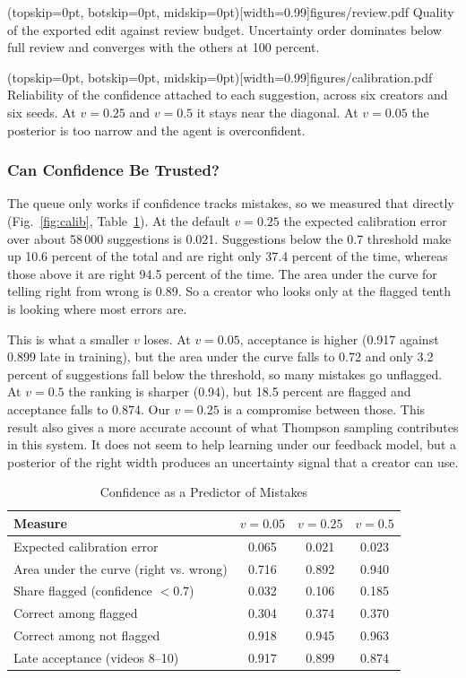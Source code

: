 \documentclass{ieeeaccess}
\begin{document}
\Figure[t!](topskip=0pt, botskip=0pt, midskip=0pt)[width=0.99\columnwidth]{figures/review.pdf}
{Quality of the exported edit against review budget. Uncertainty order dominates below full review and converges with the others at 100 percent.\label{fig:review}}

\Figure[t!](topskip=0pt, botskip=0pt, midskip=0pt)[width=0.99\columnwidth]{figures/calibration.pdf}
{Reliability of the confidence attached to each suggestion, across six creators and six seeds. At $v=0.25$ and $v=0.5$ it stays near the diagonal. At $v=0.05$ the posterior is too narrow and the agent is overconfident.\label{fig:calib}}

\subsubsection{Can Confidence Be Trusted?}
The queue only works if confidence tracks mistakes, so we measured that directly (Fig.~\ref{fig:calib}, Table~\ref{tab:calib}). At the default $v=0.25$ the expected calibration error over about 58\,000 suggestions is 0.021. Suggestions below the 0.7 threshold make up 10.6 percent of the total and are right only 37.4 percent of the time, whereas those above it are right 94.5 percent of the time. The area under the curve for telling right from wrong is 0.89. So a creator who looks only at the flagged tenth is looking where most errors are.

This is what a smaller $v$ loses. At $v=0.05$, acceptance is higher (0.917 against 0.899 late in training), but the area under the curve falls to 0.72 and only 3.2 percent of suggestions fall below the threshold, so many mistakes go unflagged. At $v=0.5$ the ranking is sharper (0.94), but 18.5 percent are flagged and acceptance falls to 0.874. Our $v=0.25$ is a compromise between those. This result also gives a more accurate account of what Thompson sampling contributes in this system. It does not seem to help learning under our feedback model, but a posterior of the right width produces an uncertainty signal that a creator can use.

\begin{table}[t]
\caption{Confidence as a Predictor of Mistakes}
\label{tab:calib}
\setlength{\tabcolsep}{3pt}
\centering
\begin{tabular}{|l|c|c|c|}
\hline
Measure & $v=0.05$ & $v=0.25$ & $v=0.5$ \\
\hline
Expected calibration error & 0.065 & 0.021 & 0.023 \\
Area under the curve (right vs. wrong) & 0.716 & 0.892 & 0.940 \\
Share flagged (confidence $<0.7$) & 0.032 & 0.106 & 0.185 \\
Correct among flagged & 0.304 & 0.374 & 0.370 \\
Correct among not flagged & 0.918 & 0.945 & 0.963 \\
Late acceptance (videos 8--10) & 0.917 & 0.899 & 0.874 \\
\hline
\end{tabular}
\end{table}
\end{document}
